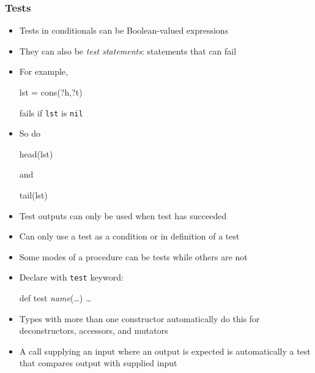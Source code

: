 \documentclass[12pt]{beamer}
\begin{document}
\begin{frame}[fragile]
\frametitle{Tests}
\begin{itemize}
\item Tests in conditionals can be Boolean-valued expressions
\item They can also be \alert{\emph{test statements}}: statements that can fail
\item For example,\quad
    \begin{minipage}{0.35\linewidth}
      \begin{block}{}
\begin{semiverbatim}
lst = cons(?h,?t)
\end{semiverbatim}
      \end{block}
    \end{minipage}\quad
 fails if \texttt{lst} is \texttt{nil}
\item So do\quad
    \begin{minipage}{0.2\linewidth}
      \begin{block}{}
\begin{semiverbatim}
head(lst)
\end{semiverbatim}
      \end{block}
    \end{minipage}\quad
 \texttt{} and\quad
    \begin{minipage}{0.2\linewidth}
      \begin{block}{}
\begin{semiverbatim}
tail(lst)
\end{semiverbatim}
      \end{block}
    \end{minipage}
\item Test outputs can only be used when test has succeeded
\item Can only use a test as a condition or in definition of a test
\item Some modes of a procedure can be tests while others are not
\item Declare with \texttt{test} keyword:
    \begin{minipage}{0.5\linewidth}
      \begin{block}{}
\begin{semiverbatim}
def \alert{test} \textit{name}(\ldots) \ldots
\end{semiverbatim}
      \end{block}
    \end{minipage}\quad


\item Types with more than one constructor automatically do this for
  deconstructors, accessors, and mutators
\item A call supplying an input where an output is expected is
  automatically a test that compares output with supplied input
\end{itemize}
\end{frame}
\end{document}
